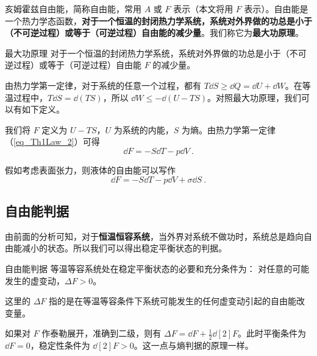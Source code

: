 

亥姆霍兹自由能，简称自由能，常用 $A$ 或 $F$ 表示（本文将用 $F$ 表示）。自由能是一个热力学态函数，\textbf{对于一个恒温的封闭热力学系统，系统对外界做的功总是小于（不可逆过程）或等于（可逆过程）自由能的减少量}。我们称它为\textbf{最大功原理}。
\begin{theorem}{最大功原理}
对于一个恒温的封闭热力学系统，系统对外界做的功总是小于（不可逆过程）或等于（可逆过程）自由能 $F$ 的减少量。
\end{theorem}

由热力学第一定律，对于系统的任意一个过程，都有 $T\dd S\ge \dd Q=\dd U+\dd W$。在等温过程中，$T\dd S=\dd (TS)$，所以 $\dd W\le - \dd (U-TS)$。对照最大功原理，我们可以有如下定义。

我们将 $F$ 定义为 $U-TS$，$U$ 为系统的内能，$S$ 为熵。由热力学第一定律（\autoref{eq_Th1Law_2}）可得
\begin{equation}
\dd F=-S\dd T-p\dd V~.
\end{equation}

假如考虑表面张力，则液体的自由能可以写作
\begin{equation}
\dd F=-S\dd T-p \dd V+\sigma \dd S~.
\end{equation}
\subsection{自由能判据}
由前面的分析可知，对于\textbf{恒温恒容系统}，当外界对系统不做功时，系统总是趋向自由能减小的状态。所以我们可以得出稳定平衡状态的判据。

\begin{theorem}{自由能判据}
等温等容系统处在稳定平衡状态的必要和充分条件为：
对任意的可能发生的虚变动，$\Delta F>0$。

这里的 $\Delta F$ 指的是在等温等容条件下系统可能发生的任何虚变动引起的自由能改变量。

\end{theorem}

如果对 $F$ 作泰勒展开，准确到二级，则有 $\Delta F=\dd F+\frac{1}{2}\dd[2]{F}$。此时平衡条件为 $\dd F=0$，稳定性条件为 $\dd[2]{F}>0$。这一点与熵判据的原理一样。
